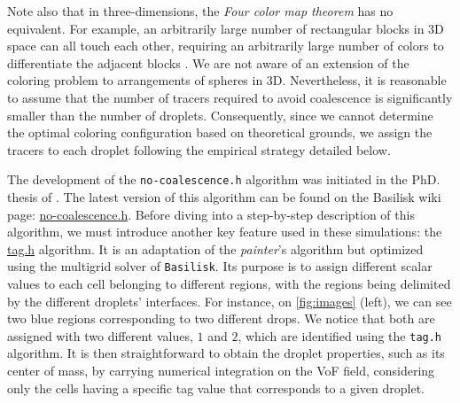 Note also that in three-dimensions, the \textit{Four color map theorem} has no equivalent.
For example, an arbitrarily large number of rectangular blocks in 3D space can all touch each other, requiring an arbitrarily large number of colors to differentiate the adjacent blocks \citep{magnant2011coloring}. 
We are not aware of an extension of the coloring problem to arrangements of spheres in 3D. 
Nevertheless, it is reasonable to assume that the number of tracers required to avoid coalescence is significantly smaller than the number of droplets.
Consequently, since we cannot determine the optimal coloring configuration based on theoretical grounds, we assign the tracers to each droplet following the empirical strategy detailed below.

The development of the \texttt{no-coalescence.h} algorithm was initiated in the PhD. thesis of \citet{mani2021numerical}.
The latest version of this algorithm can be found on the Basilisk wiki page: \href{http://basilisk.fr/src/no-coalescence.h}{no-coalescence.h}.
Before diving into a step-by-step description of this algorithm, we must introduce another key feature used in these simulations: the \href{http://basilisk.fr/src/tag.h}{tag.h} algorithm. 
It is an adaptation of the \textit{painter}'s algorithm but optimized using the multigrid solver of \texttt{Basilisk}. 
Its purpose is to assign different scalar values to each cell belonging to different regions, with the regions being delimited by the different droplets' interfaces. 
For instance, on \ref{fig:images} (left), we can see two blue regions corresponding to two different drops.
We notice that both are assigned with two different values, $1$ and $2$, which are identified using the \texttt{tag.h} algorithm. 
It is then straightforward to obtain the droplet properties, such as its center of mass, by carrying numerical integration on the VoF field, considering only the cells having a specific tag value that corresponds to a given droplet.  

